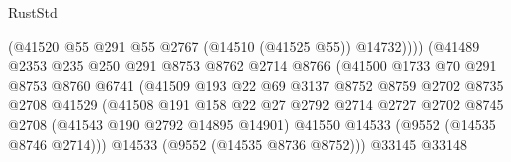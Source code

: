 \begin{lexlean}{RustStd}
\begin{coremodule}
                                          (@41520
                                            @55
                                            @291
                                            @55
                                            @2767
                                            (@14510 (@41525 @55))
                                            @14732))))
                                    (@41489
                                      @2353
                                      @235
                                      @250
                                      @291
                                      @8753
                                      @8762
                                      @2714
                                      @8766
                                      (@41500
                                        @1733
                                        @70
                                        @291
                                        @8753
                                        @8760
                                        @6741
                                        (@41509
                                          @193
                                          @22
                                          @69
                                          @3137
                                          @8752
                                          @8759
                                          @2702
                                          @8735
                                          @2708
                                          @41529
                                          (@41508
                                            @191
                                            @158
                                            @22
                                            @27
                                            @2792
                                            @2714
                                            @2727
                                            @2702
                                            @8745
                                            @2708
                                            (@41543 @190 @2792 @14895 @14901)
                                            @41550
                                            @14533
                                            (@9552 (@14535 @8746 @2714)))
                                          @14533
                                          (@9552 (@14535 @8736 @8752)))
                                        @33145
                                        @33148

\end{coremodule}
\end{lexlean}
